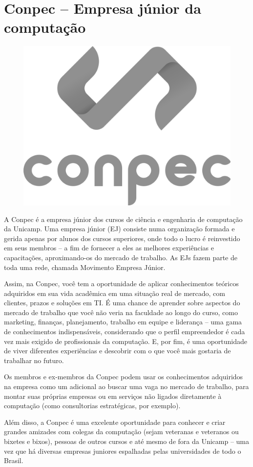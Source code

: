 
\section{Conpec -- Empresa júnior da computação}

\begin{figure}[H]
  \centering
  \includegraphics[width=.35\textwidth]{img/alem_da_graduacao/conpec_logo.png}
\end{figure}


A Conpec é a empresa júnior dos cursos de ciência e engenharia de computação da
Unicamp. Uma empresa júnior (EJ) consiste numa organização formada e gerida
apenas por alunos dos cursos superiores, onde todo o lucro é reinvestido em seus
membros -- a fim de fornecer a eles as melhores experiências e capacitações,
aproximando-os do mercado de trabalho. As EJs fazem parte de toda uma rede,
chamada Movimento Empresa Júnior.

Assim, na Conpec, você tem a oportunidade de aplicar conhecimentos teóricos
adquiridos em sua vida acadêmica em uma situação real de mercado, com clientes,
prazos e soluções em TI. É uma chance de aprender sobre aspectos do mercado de
trabalho que você não veria na faculdade ao longo do curso, como marketing,
finanças, planejamento, trabalho em equipe e liderança -- uma gama de
conhecimentos indispensáveis, considerando que o perfil empreendedor é cada vez
mais exigido de profissionais da computação. E, por fim, é uma oportunidade de
viver diferentes experiências e descobrir com o que você mais gostaria de
trabalhar no futuro.

Os membros e ex-membros da Conpec podem usar os conhecimentos adquiridos na
empresa como um adicional ao buscar uma vaga no mercado de trabalho, para montar
suas próprias empresas ou em serviços não ligados diretamente à computação
(como consultorias estratégicas, por exemplo).

Além disso, a Conpec é uma excelente oportunidade para conhecer e criar grandes
amizades com colegas da computação (sejam veteranas e veteranos ou bixetes e
bixos), pessoas de outros cursos e até mesmo de fora da Unicamp -- uma vez que
há diversas empresas juniores espalhadas pelas universidades de todo o Brasil.

